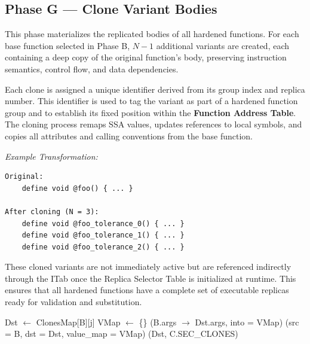 \subsection*{Phase G — Clone Variant Bodies}
This phase materializes the replicated bodies of all hardened functions.  
For each base function selected in Phase B, \(N-1\) additional variants are created,
each containing a deep copy of the original function’s body, preserving
instruction semantics, control flow, and data dependencies.

Each clone is assigned a unique identifier derived from its group index and
replica number. This identifier is used to tag the variant as part of a hardened
function group and to establish its fixed position within the
\textbf{Function Address Table}.  
The cloning process remaps SSA values, updates references to local symbols, and
copies all attributes and calling conventions from the base function.

\begin{center}
\textit{Example Transformation:}
\end{center}

\begin{verbatim}
Original:
    define void @foo() { ... }

After cloning (N = 3):
    define void @foo_tolerance_0() { ... }
    define void @foo_tolerance_1() { ... }
    define void @foo_tolerance_2() { ... }
\end{verbatim}

These cloned variants are not immediately active but are referenced indirectly
through the ITab once the Replica Selector Table is initialized at runtime.
This ensures that all hardened functions have a complete set of executable
replicas ready for validation and substitution.

\begin{algorithm}[H]
\caption{Phase G — Deep Clone Variant Bodies}
\label{alg:phaseG}
\begin{algorithmic}[1]
    \State Dst  $\gets$ ClonesMap[B][j]
    \State VMap $\gets$ \{\}
    \State {}(B.args $\rightarrow$ Dst.args, into = VMap)
    \State {}(src = B, dst = Dst, value\_map = VMap)
     \State {}(Dst, C.SEC\_CLONES) \EndIf
  \EndFor
\EndFor
\end{algorithmic}
\end{algorithm}
\clearpage

